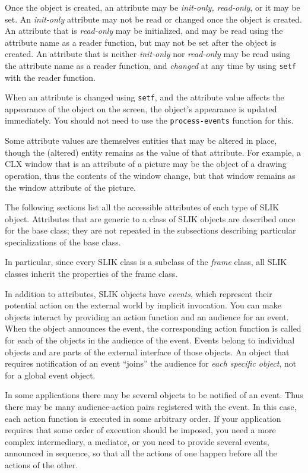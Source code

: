 \documentclass[twoside,openright,11pt]{report}
\newcommand{\tp}[1]{\texttt{#1}}
\begin{document}
Once the object is created, an attribute may be \emph{init-only,
read-only}, or it may be set.  An \emph{init-only} attribute may not
be read or changed once the object is created.  An attribute that is
\emph{read-only} may be initialized, and may be read using the
attribute name as a reader function, but may not be set after the
object is created.  An attribute that is neither \emph{init-only} nor
\emph{read-only} may be read using the attribute name as a reader
function, and \emph{changed} at any time by using \tp{setf} with
the reader function.

When an attribute is changed using \tp{setf}, and the attribute
value affects the appearance of the object on the screen, the object's
appearance is updated immediately.  You should not need to use the
\tp{process-events} function for this.

Some attribute values are themselves entities that may be altered in
place, though the (altered) entity remains as the value of that
attribute.  For example, a CLX window that is an attribute of a
picture may be the object of a drawing operation, thus the contents of
the window change, but that window remains as the window attribute of
the picture.

The following sections list all the accessible attributes of each type
of SLIK object.  Attributes that are generic to a class of SLIK
objects are described once for the base class; they are not repeated
in the subsections describing particular specializations of the base
class.

In particular, since every SLIK class is a subclass of the
\textit{frame} class, all SLIK classes inherit the properties of the
frame class.

In addition to attributes, SLIK objects have \emph{events}, which
represent their potential action on the external world by implicit
invocation.  You can make objects interact by providing an action
function and an audience for an event.  When the object announces the
event, the corresponding action function is called for each of the
objects in the audience of the event.  Events belong to individual
objects and are parts of the external interface of those objects.  An
object that requires notification of an event ``joins'' the audience
for \emph{each specific object}, not for a global event object.

In some applications there may be several objects to be notified of an
event.  Thus there may be many audience-action pairs registered with
the event.  In this case, each action function is executed in some
arbitrary order.  If your application requires that some order of
execution should be imposed, you need a more complex intermediary, a
mediator, or you need to provide several events, announced in
sequence, so that all the actions of one happen before all the actions
of the other.
\end{document}
